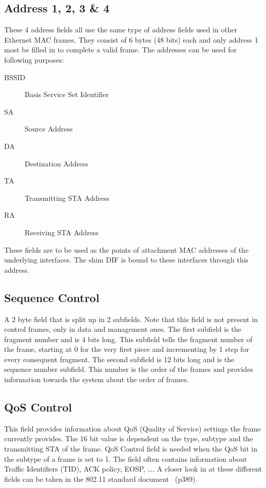 \subsection{Address 1, 2, 3 \& 4}

These 4 address fields all use the same type of address fields used in other Ethernet MAC frames. They consist of 6 bytes (48 bits) each and only address 1 most be filled in to complete a valid frame. The addresses can be used for following purposes:

\begin{description}
	\item[BSSID] Basis Service Set Identifier 
	\item[SA] Source Address
	\item[DA] Destination Address
	\item[TA] Transmitting STA Address
	\item[RA] Receiving STA Address
\end{description}

These fields are to be used as the points of attachment MAC addresses of the underlying interfaces. The shim DIF is bound to these interfaces through this address. 

\subsection{Sequence Control}

A 2 byte field that is split up in 2 subfields. Note that this field is not present in control frames, only in data and management ones. The first subfield is the fragment number and is 4 bits long. This subfield tells the fragment number of the frame, starting at 0 for the very first piece and incrementing by 1 step for every consequent fragment. The second subfield is 12 bits long and is the sequence number subfield. This number is the order of the frames and provides information towards the system about the order of frames.

\subsection{QoS Control}


This field provides information about QoS (Quality of Service) settings the frame currently provides. The 16 bit value is dependent on the type, subtype and the transmitting STA of the frame. QoS Control field is needed when the QoS bit in the subtype of a frame is set to 1. The field often contains information about Traffic Identifiers (TID), ACK policy, EOSP, \ldots. A closer look in at these different fields can be taken in the 802.11 standard document~\citep{ieee80211std} (p389). 

